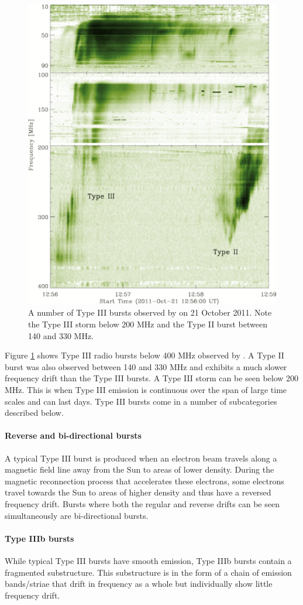 \begin{figure}
    \centering
    \includegraphics[width=0.5\columnwidth]{Images/Pietro_typeIII.png}
    \caption[A number of Type III bursts observed by \cite{Zucca2012} on 21 October 2011.]{A number of Type III bursts observed by \cite{Zucca2012} on 21 October 2011. Note the Type III storm below 200 MHz and the Type II burst between 140 and 330 MHz.}
    \label{fig:bursts}
\end{figure}

Figure \ref{fig:bursts} shows Type III radio bursts below 400 MHz observed by \cite{Zucca2012}. A Type II burst was also observed between 140 and 330 MHz and exhibits a much slower frequency drift than the Type III bursts. A Type III storm can be seen below 200 MHz. This is when Type III emission is continuous over the span of large time scales and can last days. Type III bursts come in a number of subcategories described below.

\paragraph{Reverse and bi-directional bursts}
A typical Type III burst is produced when an electron beam travels along a magnetic field line away from the Sun to areas of lower density. During the magnetic reconnection process that accelerates these electrons, some electrons travel towards the Sun to areas of higher density and thus have a reversed frequency drift. Bursts where both the regular and reverse drifts can be seen simultaneously are bi-directional bursts.

\paragraph{Type IIIb bursts}
While typical Type III bursts have smooth emission, Type IIIb bursts contain a fragmented substructure. This substructure is in the form of a chain of emission bands/striae that drift in frequency as a whole but individually show little frequency drift.

